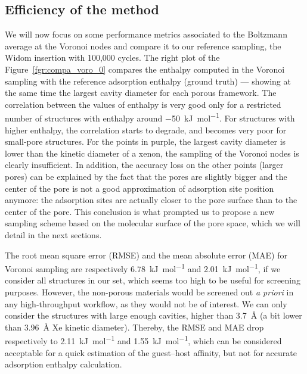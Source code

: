 \documentclass[main]{subfiles}
\begin{document}
\subsection{Efficiency of the method}

We will now focus on some performance metrics associated to the Boltzmann average at the Voronoi nodes and compare it to our reference sampling, the Widom insertion with 100,000 cycles. The right plot of the Figure~\ref{fgr:compa_voro_0} compares the enthalpy computed in the Voronoi sampling with the reference adsorption enthalpy (ground truth) --- showing at the same time the largest cavity diameter for each porous framework. The correlation between the values of enthalpy is very good only for a restricted number of structures with enthalpy around \SI{-50}{\kilo\joule\per\mole}. For structures with higher enthalpy, the correlation starts to degrade, and becomes very poor for small-pore structures. For the points in purple, the largest cavity diameter is lower than the kinetic diameter of a xenon, the sampling of the Voronoi nodes is clearly insufficient. In addition, the accuracy loss on the other points (larger pores) can be explained by the fact that the pores are slightly bigger and the center of the pore is not a good approximation of adsorption site position anymore: the adsorption sites are actually closer to the pore surface than to the center of the pore. This conclusion is what prompted us to propose a new sampling scheme based on the molecular surface of the pore space, which we will detail in the next sections.

The root mean square error (RMSE) {and the mean absolute error (MAE) for Voronoi sampling are respectively \SI{6.78}{\kilo\joule\per\mole} and \SI{2.01}{\kilo\joule\per\mole}}, if we consider all structures in our set, which seems too high to be useful for screening purposes. However, the non-porous materials would be screened out \emph{a priori} in any high-throughput workflow, as they would not be of interest. We can only consider the structures with large enough cavities, higher than \SI{3.7}{\angstrom} (a bit lower than \SI{3.96}{\angstrom} Xe kinetic diameter). Thereby, {the RMSE and MAE drop respectively to \SI{2.11}{\kilo\joule\per\mole} and \SI{1.55}{\kilo\joule\per\mole}}, which can be considered acceptable for a quick estimation of the guest--host affinity, but not for accurate adsorption enthalpy calculation.
\end{document}
